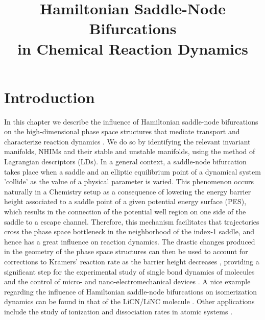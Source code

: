 \documentclass[8pt]{article}
\begin{document}

	
\title{\vspace{-2.2cm} Hamiltonian Saddle-Node Bifurcations \\ in Chemical Reaction Dynamics}

\date{}	
	
\maketitle

\vspace{-0.9cm}

\section{Introduction}

In this chapter we describe the influence of Hamiltonian saddle-node bifurcations on the high-dimensional phase space structures that mediate transport and characterize reaction dynamics \cite{GG2019}. We do so by identifying the relevant invariant manifolds, NHIMs and their stable and unstable manifolds, using the method of Lagrangian descriptors (LDs). In a general context, a saddle-node bifurcation takes place when a saddle and an elliptic equilibrium point of a dynamical system 'collide' as the value of a physical parameter is varied. This phenomenon occurs naturally in a Chemistry setup as a consequence of lowering the energy barrier height associated to a saddle point of a given potential energy surface (PES), which results in the connection of the potential well region on one side of the saddle to a escape channel. Therefore, this mechanism facilitates that trajectories cross the phase space bottleneck in the neighborhood of the index-1 saddle, and hence has a great influence on reaction dynamics. The drastic changes produced in the geometry of the phase space structures can then be used to account for corrections to Kramers' reaction rate as the barrier height decreases \cite{hathcock2019renormalization}, providing a significant step for the experimental study of single bond dynamics of molecules and the control of micro- and nano-electromechanical devices \cite{hathcock2019renormalization,husson2009force,miller2012escape,herbert2017predictability}. A nice example regarding the influence of Hamiltonian saddle-node bifurcations on isomerization dynamics can be found in that of the LiCN/LiNC molecule \cite{borondo1995,borondo1996,revuelta2019unveiling}. Other applications include the study of ionization and dissociation rates in atomic systems \cite{de_leon_intramolecular_1981,mitchell_geometry_2003_I,mitchell_geometry_2003_II,mitchell_chaos-induced_2004,mitchell_analysis_2004,mitchell_structure_2007,mitchell_nonlinear_2009,wang_photoionization_2010}. 
\end{document}
